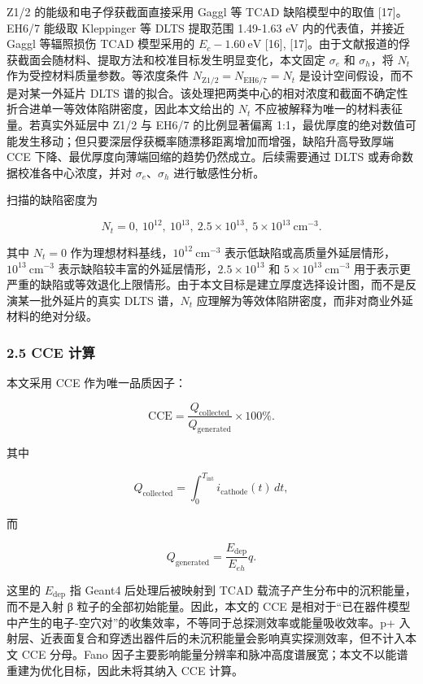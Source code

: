 \documentclass[
  10pt,
  a4paper,
]{ctexart}
\begin{document}
Z1/2 的能级和电子俘获截面直接采用 Gaggl 等 TCAD 缺陷模型中的取值
{[}17{]}。EH6/7 能级取 Kleppinger 等 DLTS 提取范围 1.49-1.63 eV
内的代表值，并接近 Gaggl 等辐照损伤 TCAD 模型采用的
\(E_c-1.60\ \mathrm{eV}\) {[}16{]},
{[}17{]}。由于文献报道的俘获截面会随材料、提取方法和校准目标发生明显变化，本文固定
\(\sigma_e\) 和 \(\sigma_h\)，将 \(N_t\)
作为受控材料质量参数。等浓度条件
\(N_{\mathrm{Z1/2}}=N_{\mathrm{EH6/7}}=N_t\)
是设计空间假设，而不是对某一外延片 DLTS
谱的拟合。该处理把两类中心的相对浓度和截面不确定性折合进单一等效体陷阱密度，因此本文给出的
\(N_t\) 不应被解释为唯一的材料表征量。若真实外延层中 Z1/2 与 EH6/7
的比例显著偏离
1:1，最优厚度的绝对数值可能发生移动；但只要深层俘获概率随漂移距离增加而增强，缺陷升高导致厚端
CCE 下降、最优厚度向薄端回缩的趋势仍然成立。后续需要通过 DLTS
或寿命数据校准各中心浓度，并对 \(\sigma_e\)、\(\sigma_h\)
进行敏感性分析。

扫描的缺陷密度为

\[
N_t = 0,\ 10^{12},\ 10^{13},\ 2.5\times10^{13},\ 5\times10^{13}\ \mathrm{cm^{-3}}.
\]

其中 \(N_t=0\) 作为理想材料基线，\(10^{12}\ \mathrm{cm^{-3}}\)
表示低缺陷或高质量外延层情形，\(10^{13}\ \mathrm{cm^{-3}}\)
表示缺陷较丰富的外延层情形，\(2.5\times10^{13}\) 和
\(5\times10^{13}\ \mathrm{cm^{-3}}\)
用于表示更严重的缺陷或等效退化上限情形。由于本文目标是建立厚度选择设计图，而不是反演某一批外延片的真实
DLTS 谱，\(N_t\) 应理解为等效体陷阱密度，而非对商业外延材料的绝对分级。

\subsubsection{2.5 CCE 计算}\label{cce-ux8ba1ux7b97}

本文采用 CCE 作为唯一品质因子：

\[
\mathrm{CCE}=\frac{Q_{\mathrm{collected}}}{Q_{\mathrm{generated}}}\times100\%.
\]

其中

\[
Q_{\mathrm{collected}}=\int_0^{T_{\mathrm{int}}}i_{\mathrm{cathode}}(t)\,dt,
\]

而

\[
Q_{\mathrm{generated}}=\frac{E_{\mathrm{dep}}}{E_{eh}}q.
\]

这里的 \(E_{\mathrm{dep}}\) 指 Geant4 后处理后被映射到 TCAD
载流子产生分布中的沉积能量，而不是入射 β
粒子的全部初始能量。因此，本文的 CCE
是相对于``已在器件模型中产生的电子-空穴对''的收集效率，不等同于总探测效率或能量吸收效率。p+
入射层、近表面复合和穿透出器件后的未沉积能量会影响真实探测效率，但不计入本文
CCE 分母。Fano
因子主要影响能量分辨率和脉冲高度谱展宽；本文不以能谱重建为优化目标，因此未将其纳入
CCE 计算。
\end{document}
